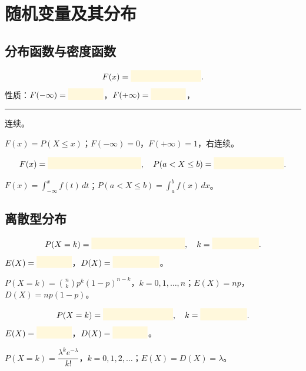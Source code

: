 \documentclass[11pt,a4paper]{article}
\newcommand{\blankbox}[1]{%
  \textcolor{blankyellow}{\rule[-0.1cm]{#1}{0.5cm}}%
}
\begin{document}
\section{随机变量及其分布}

\subsection{分布函数与密度函数}

\begin{formulabox}[分布函数]
\[F(x) = \blankbox{3cm}.\]
性质：$F(-\infty)=\blankbox{1.5cm}$，$F(+\infty)=\blankbox{1.5cm}$，\blankbox{2cm}连续。
\end{formulabox}

\begin{answerbox}
$F(x)=P(X\leq x)$；$F(-\infty)=0$，$F(+\infty)=1$，右连续。
\end{answerbox}

\begin{formulabox}[连续型密度与分布函数关系]
\[F(x) = \blankbox{4cm}, \quad P(a<X\leq b) = \blankbox{3cm}.\]
\end{formulabox}

\begin{answerbox}
$F(x)=\displaystyle\int_{-\infty}^{x} f(t)\,dt$；$P(a<X\leq b)=\displaystyle\int_a^b f(x)\,dx$。
\end{answerbox}

\subsection{离散型分布}

\begin{formulabox}[二项分布 $B(n,p)$]
\[P(X=k) = \blankbox{4cm}, \quad k=\blankbox{2cm}.\]
$E(X)=\blankbox{1.5cm}$，$D(X)=\blankbox{2cm}$。
\end{formulabox}

\begin{answerbox}
$P(X=k)=\binom{n}{k}p^k(1-p)^{n-k}$，$k=0,1,\dots,n$；$E(X)=np$，$D(X)=np(1-p)$。
\end{answerbox}

\begin{formulabox}
\[P(X=k) = \blankbox{3cm}, \quad k=\blankbox{2cm}.\]
$E(X)=\blankbox{1.5cm}$，$D(X)=\blankbox{1.5cm}$。
\end{formulabox}

\begin{answerbox}
$P(X=k)=\dfrac{\lambda^k e^{-\lambda}}{k!}$，$k=0,1,2,\dots$；$E(X)=D(X)=\lambda$。
\end{answerbox}
\end{document}
